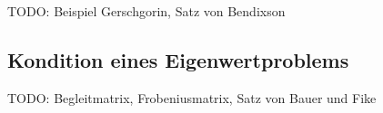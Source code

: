 TODO: Beispiel Gerschgorin, Satz von Bendixson

\subsection{Kondition eines Eigenwertproblems}

TODO: Begleitmatrix, Frobeniusmatrix, Satz von Bauer und Fike
